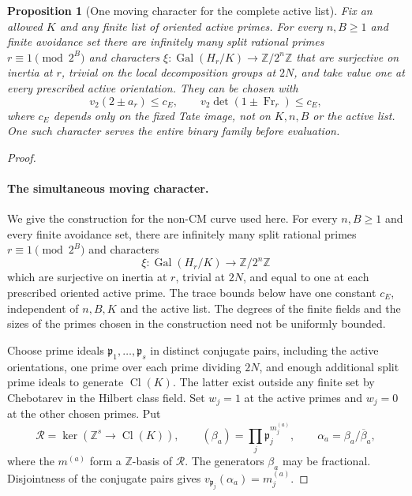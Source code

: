 \documentclass[11pt]{article}
\newtheorem{proposition}[theorem]{Proposition}
\theoremstyle{definition}
\theoremstyle{remark}
\newcommand{\Z}{\mathbb Z}
\begin{document}
\begin{proposition}[One moving character for the complete active list]\label{ex:arith-moving-character}
Fix an allowed $K$ and any finite list of oriented active primes.
For every $n,B\geq1$ and finite avoidance set there are infinitely
many split rational primes $r\equiv1\pmod{2^B}$ and characters
$\xi:\operatorname{Gal}(H_r/K)\to\Z/2^n\Z$ that are surjective
on inertia at $r$, trivial on the local decomposition groups at
$2N$, and take value one at every prescribed active orientation.
They can be chosen with
\[
 v_2(2\pm a_r)\leq c_E,\qquad
 v_2\det(1\pm\operatorname{Fr}_r)\leq c_E,
\]
where $c_E$ depends only on the fixed Tate image, not on $K,n,B$
or the active list. One such character serves the entire binary
family before evaluation.
\end{proposition}
\begin{proof}\leavevmode
\paragraph{The simultaneous moving character.}
We give the construction for the non-CM curve used here. For every
$n,B\ge1$ and every finite avoidance set, there are infinitely many
split rational primes $r\equiv1\pmod{2^B}$ and characters
\[
 \xi:\operatorname{Gal}(H_r/K)\longrightarrow\Z/2^n\Z
\]
which are surjective on inertia at $r$, trivial at $2N$, and equal
to one at each prescribed oriented active prime. The trace bounds
below have one constant $c_E$, independent of $n,B,K$ and the active
list. The degrees of the finite fields and the sizes of the primes
chosen in the construction need not be uniformly bounded.

Choose prime ideals $\mathfrak p_1,\ldots,\mathfrak p_s$ in distinct
conjugate pairs, including the active orientations, one prime over
each prime dividing $2N$, and enough additional split prime ideals
to generate $\operatorname{Cl}(K)$. The latter exist outside any
finite set by Chebotarev in the Hilbert class field. Set $w_j=1$ at
the active primes and $w_j=0$ at the other chosen primes. Put
\[
 \mathcal R=\ker(\Z^s\longrightarrow\operatorname{Cl}(K)),
 \qquad (\beta_a)=\prod_j\mathfrak p_j^{m_j^{(a)}},
 \qquad \alpha_a=\beta_a/\overline\beta_a,
\]
where the $m^{(a)}$ form a $\Z$-basis of $\mathcal R$.
The generators $\beta_a$ may be fractional. Disjointness of the
conjugate pairs gives $v_{\mathfrak p_j}(\alpha_a)=m_j^{(a)}$.


\end{proof}
\end{document}
